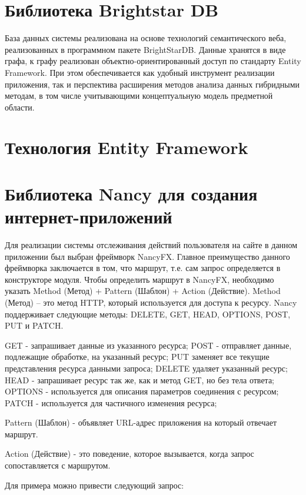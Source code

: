 \documentclass[a4paper,14pt,openany,final]{extreport} %
\begin{document}
\section{Библиотека Brightstar DB}
База данных системы реализована на основе технологий семантического веба, реализованных в программном пакете BrightStarDB. Данные хранятся в виде графа, к графу реализован объектно-ориентированный доступ по стандарту Entity Framework. При этом обеспечивается как удобный инструмент реализации приложения, так и перспектива расширения методов анализа данных гибридными методам, в том числе учитывающими концептуальную модель предметной области.
\section{Технология Entity Framework}
\section{Библиотека Nancy для создания интернет-приложений}

Для реализации системы отслеживания действий пользователя на сайте в данном приложении был выбран фреймворк NancyFX. Главное преимущество данного фреймворка заключается в том, что маршрут, т.е. сам запрос определяется в конструкторе модуля. Чтобы определить маршрут в NancyFX, необходимо указать Method (Метод) + Pattern (Шаблон) + Action (Действие).
Method (Метод) – это метод HTTP, который используется для доступа к ресурсу. Nancy поддерживает следующие методы: DELETE, GET, HEAD, OPTIONS, POST, PUT и PATCH.

GET - запрашивает данные из указанного ресурса; POST - отправляет данные, подлежащие обработке, на указанный ресурс; PUT заменяет все текущие представления ресурса данными запроса; DELETE удаляет указанный ресурс; HEAD - запрашивает ресурс так же, как и метод GET, но без тела ответа; OPTIONS - используется для описания параметров соединения с ресурсом; PATCH - используется для частичного изменения ресурса;

Pattern (Шаблон) - объявляет URL-адрес приложения на который отвечает маршрут.

Action (Действие) - это поведение, которое вызывается, когда запрос сопоставляется с маршрутом.

Для примера можно привести следующий запрос:
\end{document}
